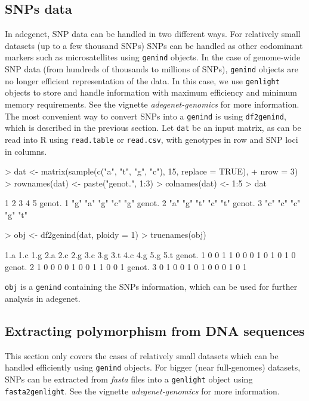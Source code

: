 \documentclass{article}
\begin{document}
\subsection{SNPs data}
In adegenet, SNP data can be handled in two different ways.
For relatively small datasets (up to a few thousand SNPs) SNPs can
be handled as other codominant markers such as microsatellites using \texttt{genind} objects.
In the case of genome-wide SNP data (from hundreds of thousands to millions of SNPs),
\texttt{genind} objects are no longer efficient representation of the data.
In this case, we use \texttt{genlight} objects to store and handle information with maximum
efficiency and minimum memory requirements. See the vignette \textit{adegenet-genomics} for more information.
\\

The most convenient way to convert SNPs into a \texttt{genind} is using \texttt{df2genind}, which is
described in the previous section.
Let \texttt{dat} be an input matrix, as can be read into R using \texttt{read.table} or \texttt{read.csv},
with genotypes in row and SNP loci in columns.
\begin{Schunk}
\begin{Sinput}
> dat <- matrix(sample(c("a", "t", "g", "c"), 15, replace = TRUE), 
+     nrow = 3)
> rownames(dat) <- paste("genot.", 1:3)
> colnames(dat) <- 1:5
> dat
\end{Sinput}
\begin{Soutput}
         1   2   3   4   5  
genot. 1 "g" "a" "g" "c" "g"
genot. 2 "a" "g" "t" "c" "t"
genot. 3 "c" "c" "c" "g" "t"
\end{Soutput}
\begin{Sinput}
> obj <- df2genind(dat, ploidy = 1)
> truenames(obj)
\end{Sinput}
\begin{Soutput}
         1.a 1.c 1.g 2.a 2.c 2.g 3.c 3.g 3.t 4.c 4.g 5.g 5.t
genot. 1   0   0   1   1   0   0   0   1   0   1   0   1   0
genot. 2   1   0   0   0   0   1   0   0   1   1   0   0   1
genot. 3   0   1   0   0   1   0   1   0   0   0   1   0   1
\end{Soutput}
\end{Schunk}

\texttt{obj} is a \texttt{genind} containing the SNPs information, which can be used for further
analysis in adegenet.



\subsection{Extracting polymorphism from DNA sequences}
This section only covers the cases of relatively small datasets which can be handled efficiently
using \texttt{genind} objects. For bigger (near full-genomes) datasets, SNPs can be extracted from
\textit{fasta} files into a \texttt{genlight} object using \texttt{fasta2genlight}.
See the vignette \textit{adegenet-genomics} for more information.
\\
\end{document}
